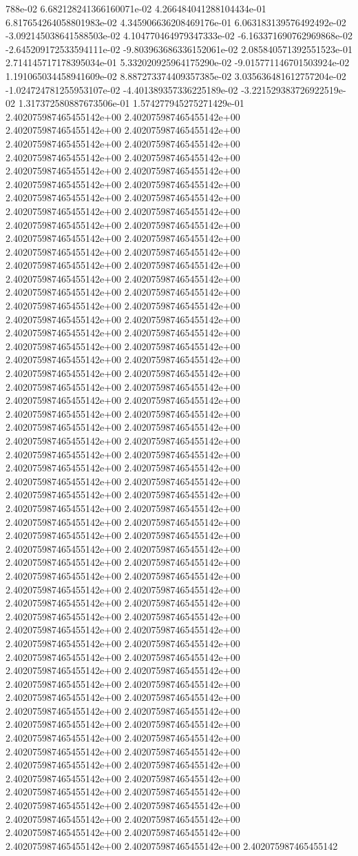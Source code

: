 788e-02	6.682128241366160071e-02	4.266484041288104434e-01	6.817654264058801983e-02	4.345906636208469176e-01	6.063183139576492492e-02	-3.092145038641588503e-02	4.104770464979347333e-02	-6.163371690762969868e-02	-2.645209172533594111e-02	-9.803963686336152061e-02	2.085840571392551523e-01	2.714145717178395034e-01	5.332020925964175290e-02	-9.015771146701503924e-02	1.191065034458941609e-02	8.887273374409357385e-02	3.035636481612757204e-02	-1.024724781255953107e-02	-4.401389357336225189e-02	-3.221529383726922519e-02	1.317372580887673506e-01	1.574277945275271429e-01
2.402075987465455142e+00	2.402075987465455142e+00	2.402075987465455142e+00	2.402075987465455142e+00	2.402075987465455142e+00	2.402075987465455142e+00	2.402075987465455142e+00	2.402075987465455142e+00	2.402075987465455142e+00	2.402075987465455142e+00	2.402075987465455142e+00	2.402075987465455142e+00	2.402075987465455142e+00	2.402075987465455142e+00	2.402075987465455142e+00	2.402075987465455142e+00	2.402075987465455142e+00	2.402075987465455142e+00	2.402075987465455142e+00	2.402075987465455142e+00	2.402075987465455142e+00	2.402075987465455142e+00	2.402075987465455142e+00	2.402075987465455142e+00	2.402075987465455142e+00	2.402075987465455142e+00	2.402075987465455142e+00	2.402075987465455142e+00	2.402075987465455142e+00	2.402075987465455142e+00	2.402075987465455142e+00	2.402075987465455142e+00	2.402075987465455142e+00	2.402075987465455142e+00	2.402075987465455142e+00	2.402075987465455142e+00	2.402075987465455142e+00	2.402075987465455142e+00	2.402075987465455142e+00	2.402075987465455142e+00	2.402075987465455142e+00	2.402075987465455142e+00	2.402075987465455142e+00	2.402075987465455142e+00	2.402075987465455142e+00	2.402075987465455142e+00	2.402075987465455142e+00	2.402075987465455142e+00	2.402075987465455142e+00	2.402075987465455142e+00	2.402075987465455142e+00	2.402075987465455142e+00	2.402075987465455142e+00	2.402075987465455142e+00	2.402075987465455142e+00	2.402075987465455142e+00	2.402075987465455142e+00	2.402075987465455142e+00	2.402075987465455142e+00	2.402075987465455142e+00	2.402075987465455142e+00	2.402075987465455142e+00	2.402075987465455142e+00	2.402075987465455142e+00	2.402075987465455142e+00	2.402075987465455142e+00	2.402075987465455142e+00	2.402075987465455142e+00	2.402075987465455142e+00	2.402075987465455142e+00	2.402075987465455142e+00	2.402075987465455142e+00	2.402075987465455142e+00	2.402075987465455142e+00	2.402075987465455142e+00	2.402075987465455142e+00	2.402075987465455142e+00	2.402075987465455142e+00	2.402075987465455142e+00	2.402075987465455142e+00	2.402075987465455142e+00	2.402075987465455142e+00	2.402075987465455142e+00	2.402075987465455142e+00	2.402075987465455142e+00	2.402075987465455142e+00	2.402075987465455142e+00	2.402075987465455142e+00	2.402075987465455142e+00	2.402075987465455142e+00	2.402075987465455142e+00	2.402075987465455142e+00	2.402075987465455142e+00	2.402075987465455142e+00	2.402075987465455142e+00	2.402075987465455142e+00	2.402075987465455142e+00	2.402075987465455142e+00	2.402075987465455142e+00	2.402075987465455142e+00	2.402075987465455142e+00	2.402075987465455142e+00	2.402075987465455142e+00	2.402075987465455142e+00	2.402075987465455142e+00	2.402075987465455142e+00	2.402075987465455142e+00	2.402075987465455142e+00	2.402075987465455142e+00	2.402075987465455142e+00	2.402075987465455142